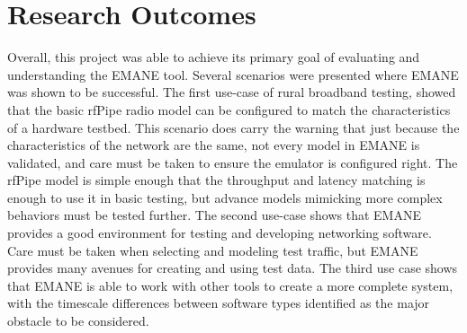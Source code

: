 \section{Research Outcomes}
Overall, this project was able to achieve its primary goal of evaluating and understanding the EMANE tool.
Several scenarios were presented where EMANE was shown to be successful.
The first use-case of rural broadband testing, showed that the basic rfPipe radio model can be configured to match the characteristics of a hardware testbed.
This scenario does carry the warning that just because the characteristics of the network are the same, not every model in EMANE is validated, and care must be taken to ensure the emulator is configured right.
The rfPipe model is simple enough that the throughput and latency matching is enough to use it in basic testing, but advance models mimicking more complex behaviors must be tested further.
The second use-case shows that EMANE provides a good environment for testing and developing networking software.
Care must be taken when selecting and modeling test traffic, but EMANE provides many avenues for creating and using test data.
The third use case shows that EMANE is able to work with other tools to create a more complete system, with the timescale differences between software types identified as the major obstacle to be considered.

